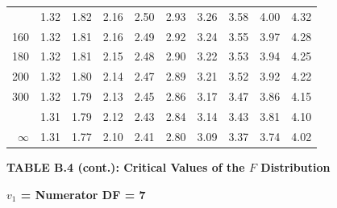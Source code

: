 \documentclass[10pt]{article}
\begin{document}
\begin{longtable}{@{}r!{\vrule width 0.8pt\hspace{0.55em}}rrrrrrrrr@{}}
 & 1.32 & 1.82 & 2.16 & 2.50 & 2.93 & 3.26 & 3.58 & 4.00 & 4.32 \\
160 & 1.32 & 1.81 & 2.16 & 2.49 & 2.92 & 3.24 & 3.55 & 3.97 & 4.28 \\
180 & 1.32 & 1.81 & 2.15 & 2.48 & 2.90 & 3.22 & 3.53 & 3.94 & 4.25 \\
200 & 1.32 & 1.80 & 2.14 & 2.47 & 2.89 & 3.21 & 3.52 & 3.92 & 4.22 \\
300 & 1.32 & 1.79 & 2.13 & 2.45 & 2.86 & 3.17 & 3.47 & 3.86 & 4.15 \\
 & 1.31 & 1.79 & 2.12 & 2.43 & 2.84 & 3.14 & 3.43 & 3.81 & 4.10 \\
$\infty$ & 1.31 & 1.77 & 2.10 & 2.41 & 2.80 & 3.09 & 3.37 & 3.74 & 4.02 \\
\end{longtable}
\newpage
\thispagestyle{empty}
\begin{center}
{\large\bfseries TABLE B.4 (cont.): Critical Values of the $F$ Distribution\par}
\end{center}
{\large\bfseries $v_1$ = Numerator DF = 7\par}
\vspace{0.5em}
\small
\end{document}

